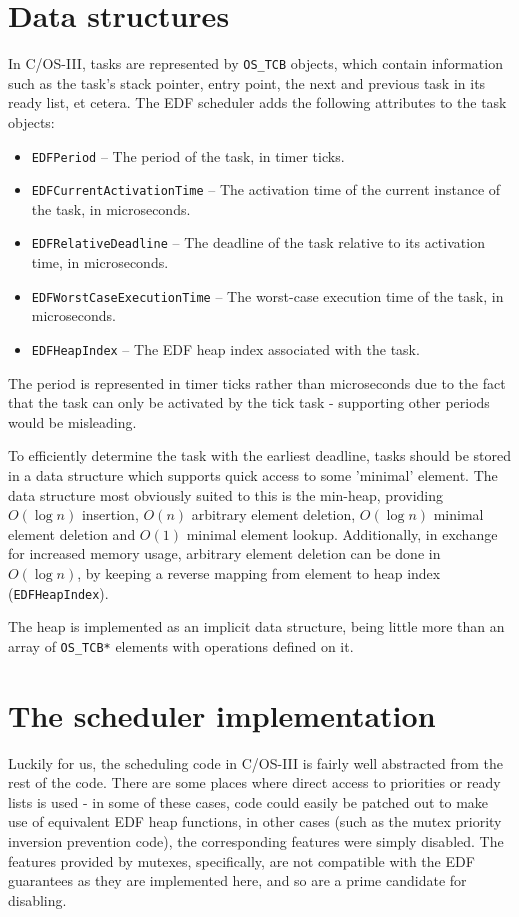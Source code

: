 \documentclass[twoside]{uva-inf-bachelor-thesis}
\newcommand{\code}[1]{\lstinline[breaklines=true]{#1}}
\newcommand{\ucosiii}{\textmu C/OS-III\xspace}
\begin{document}
\section{Data structures}
In \ucosiii, tasks are represented by \code{OS_TCB} objects, which contain information such as the task's stack pointer, entry point, the next and previous task in its ready list, et cetera. The EDF scheduler adds the following attributes to the task objects:

\begin{itemize}
    \item \code{EDFPeriod} -- The period of the task, in timer ticks.
    \item \code{EDFCurrentActivationTime} -- The activation time of the current instance of the task, in microseconds.
    \item \code{EDFRelativeDeadline} -- The deadline of the task relative to its activation time, in microseconds.
    \item \code{EDFWorstCaseExecutionTime} -- The worst-case execution time of the task, in microseconds.
    \item \code{EDFHeapIndex} -- The EDF heap index associated with the task.
\end{itemize}

The period is represented in timer ticks rather than microseconds due to the fact that the task can only be activated by the tick task - supporting other periods would be misleading.

To efficiently determine the task with the earliest deadline, tasks should be stored in a data structure which supports quick access to some 'minimal' element. The data structure most obviously suited to this is the min-heap, providing $O(\log n)$ insertion, $O(n)$ arbitrary element deletion, $O(\log n)$ minimal element deletion and $O(1)$ minimal element lookup. Additionally, in exchange for increased memory usage, arbitrary element deletion can be done in $O(\log n)$, by keeping a reverse mapping from element to heap index (\code{EDFHeapIndex}).

The heap is implemented as an implicit data structure, being little more than an array of \code{OS_TCB*} elements with operations defined on it.

\section{The scheduler implementation}
Luckily for us, the scheduling code in \ucosiii is fairly well abstracted from the rest of the code. There are some places where direct access to priorities or ready lists is used - in some of these cases, code could easily be patched out to make use of equivalent EDF heap functions, in other cases (such as the mutex priority inversion prevention code), the corresponding features were simply disabled. The features provided by mutexes, specifically, are not compatible with the EDF guarantees as they are implemented here, and so are a prime candidate for disabling.
\end{document}

